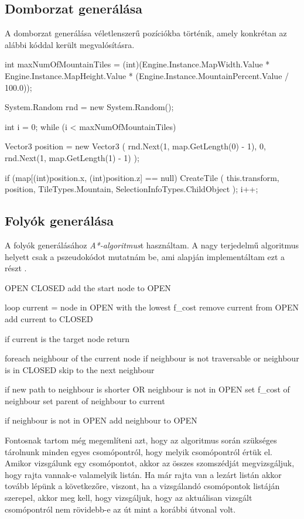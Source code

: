 \subsection{Domborzat generálása}

A domborzat generálása véletlenszerű pozíciókba történik, amely konkrétan az alábbi kóddal került megvalósításra.
\begin{cpp}
int maxNumOfMountainTiles = 
(int)(Engine.Instance.MapWidth.Value * Engine.Instance.MapHeight.Value * 
(Engine.Instance.MountainPercent.Value / 100.0));

System.Random rnd = new System.Random();

int i = 0;
while (i < maxNumOfMountainTiles)
{
   Vector3 position = new Vector3
   (
      rnd.Next(1, map.GetLength(0) - 1),
      0, rnd.Next(1, map.GetLength(1) - 1)
   );

   if (map[(int)position.x, (int)position.z] == null)
   {
      CreateTile
      (
         this.transform, position, TileTypes.Mountain, 
         SelectionInfoTypes.ChildObject
      );
      i++;
   }
}
\end{cpp}

\subsection{Folyók generálása}

A folyók generálásához \textit{A*-algoritmus}t használtam. A nagy terjedelmű algoritmus helyett csak a pszeudokódot mutatnám be, ami alapján implementáltam ezt a részt \cite{A*Code}.
\begin{cpp}
OPEN 
CLOSED 
add the start node to OPEN

loop
   current = node in OPEN  with the lowest f_cost
   remove current from OPEN
   add current to CLOSED

   if current is the target node
      return

   foreach neighbour of the current node
      if neighbour is not traversable or neighbour is in CLOSED
         skip to the next neighbour

      if new path to neighbour is shorter OR neighbour is not in OPEN
         set f_cost of neighbour
         set parent of neighbour to current
         
         if neighbour is not in OPEN
            add neighbour to OPEN
\end{cpp}

Fontosnak tartom még megemlíteni azt, hogy az algoritmus során szükséges tárolnunk minden egyes csomópontról, hogy melyik csomópontról értük el. Amikor vizsgálunk egy csomópontot, akkor az összes szomszédját megvizsgáljuk, hogy rajta vannak-e valamelyik listán. Ha már rajta van a lezárt listán akkor tovább lépünk a következőre, viszont, ha a vizsgálandó csomópontok listáján szerepel, akkor meg kell, hogy vizsgáljuk, hogy az aktuálisan vizsgált csomópontról nem rövidebb-e az út mint a korábbi útvonal volt.

